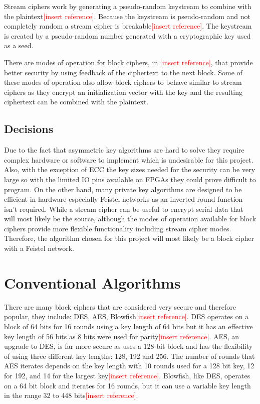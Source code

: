 \documentclass[12pt,twoside,a4paper]{report}
\begin{document}
    Stream ciphers work by generating a pseudo-random keystream to combine with the plaintext\textcolor{red}{[insert reference]}. Because the keystream is pseudo-random and not completely random a stream cipher is breakable\textcolor{red}{[insert reference]}. The keystream is created by a pseudo-random number generated with a cryptographic key used as a seed.
    
    There are modes of operation for block ciphers, in \textcolor{red}{[insert reference]}, that provide better security by using feedback of the ciphertext to the next block. Some of these modes of operation also allow block ciphers to behave similar to stream ciphers as they encrypt an initialization vector with the key and the resulting ciphertext can be combined with the plaintext.
    
    \subsection{Decisions}
    Due to the fact that asymmetric key algorithms are hard to solve they require complex hardware or software to implement which is undesirable for this project. Also, with the exception of ECC the key sizes needed for the security can be very large so with the limited IO pins available on FPGAs they could prove difficult to program. On the other hand, many private key algorithms are designed to be efficient in hardware especially Feistel networks as an inverted round function isn't required. While a stream cipher can be useful to encrypt serial data that will most likely be the source, although the modes of operation available for block ciphers provide more flexible functionality including stream cipher modes. Therefore, the algorithm chosen for this project will most likely be a block cipher with a Feistel network.
    
    \section{Conventional Algorithms}
    There are many block ciphers that are considered very secure and therefore popular, they include: DES, AES, Blowfish\textcolor{red}{[insert reference]}.
    DES operates on a block of 64 bits for 16 rounds using a key length of 64 bits but it has an effective key length of 56 bits as 8 bits were used for parity\textcolor{red}{[insert reference]}.
    AES, an upgrade to DES, is far more secure as uses a 128 bit block and has the flexibility of using three different key lengths: 128, 192 and 256. The number of rounds that AES iterates depends on the key length with 10 rounds used for a 128 bit key, 12 for 192, and 14 for the largest key\textcolor{red}{[insert reference]}.
    Blowfish, like DES, operates on a 64 bit block and iterates for 16 rounds, but it can use a variable key length in the range 32 to 448 bits\textcolor{red}{[insert reference]}.
    
\end{document}
